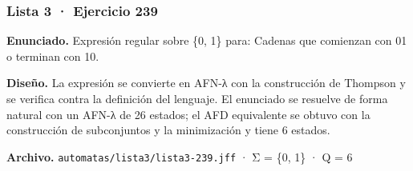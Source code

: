 
\hypertarget{lista-3-ejercicio-239}{%
\subsubsection{Lista 3 · Ejercicio 239}\label{lista-3-ejercicio-239}}

\textbf{Enunciado.} Expresión regular sobre \{0, 1\} para: Cadenas que comienzan con 01 o terminan con 10.

\textbf{Diseño.} La expresión se convierte en AFN-λ con la construcción de Thompson y se verifica contra la definición del lenguaje. El enunciado se resuelve de forma natural con un AFN-λ de 26 estados; el AFD equivalente se obtuvo con la construcción de subconjuntos y la minimización y tiene 6 estados.

\textbf{Archivo.} \texttt{automatas/lista3/lista3-239.jff} · Σ = \{0, 1\} · \textbar Q\textbar{} = 6


